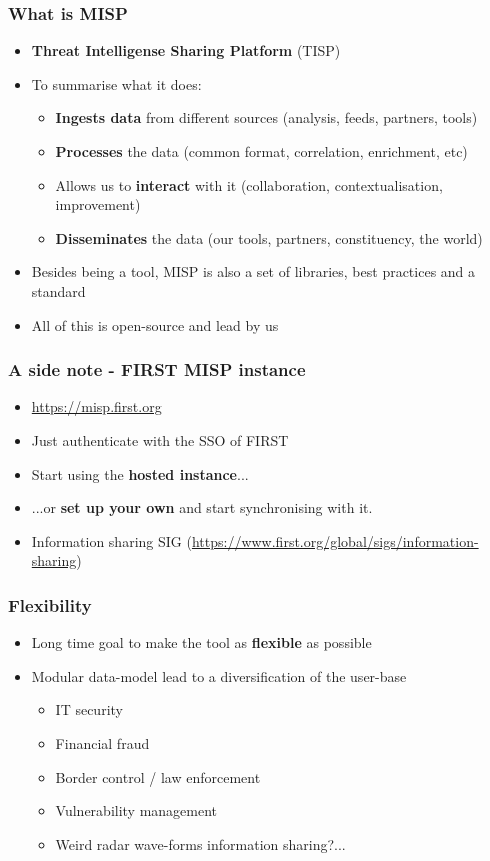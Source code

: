 \begin{frame}
 \frametitle{What is MISP}
 \begin{itemize}
         \item {\bf Threat Intelligense Sharing Platform} (TISP)
         \item To summarise what it does:
         \begin{itemize}
             \item {\bf Ingests data} from different sources (analysis, feeds, partners, tools)
             \item {\bf Processes} the data (common format, correlation, enrichment, etc)
             \item Allows us to {\bf interact} with it (collaboration, contextualisation, improvement)
             \item {\bf Disseminates} the data (our tools, partners, constituency, the world)
         \end{itemize}
         \item Besides being a tool, MISP is also a set of libraries, best practices and a standard
         \item All of this is open-source and lead by us
 \end{itemize}
\end{frame}

\begin{frame}
 \frametitle{A side note - FIRST MISP instance}
 \begin{itemize}
         \item \url{https://misp.first.org}
         \item Just authenticate with the SSO of FIRST
         \item Start using the {\bf hosted instance}...
         \item ...or {\bf set up your own} and start synchronising with it.
         \item Information sharing SIG (\url{https://www.first.org/global/sigs/information-sharing})
 \end{itemize}
\end{frame}

\begin{frame}
 \frametitle{Flexibility}
 \begin{itemize}
         \item Long time goal to make the tool as {\bf flexible} as possible
         \item Modular data-model lead to a diversification of the user-base
         \begin{itemize}
             \item IT security
             \item Financial fraud
             \item Border control / law enforcement
             \item Vulnerability management
             \item Weird radar wave-forms information sharing?...
         \end{itemize}
 \end{itemize}
\end{frame}

